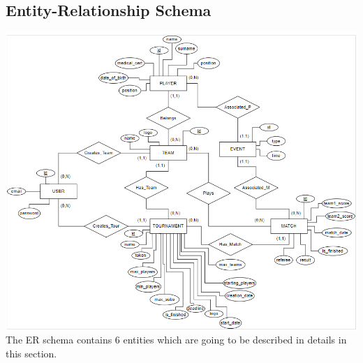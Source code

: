 \subsection{Entity-Relationship Schema}

\includegraphics[scale = 0.7]{sections/DLL/ERSchema.png}\\
The ER schema contains 6 entities which are going to be described in details in this section.

